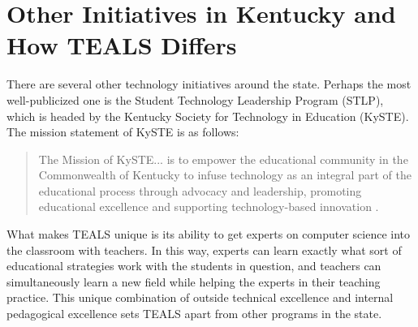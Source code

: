 \section{Other Initiatives in Kentucky and How TEALS Differs}\label{sec:diffs}

There are several other technology initiatives around the state. Perhaps the
most well-publicized one is the Student Technology Leadership Program (STLP),
which is headed by the Kentucky Society for Technology in Education (KySTE).
The mission statement of KySTE is as follows:

\begin{quote}
The Mission of KySTE... is to empower the educational community in the
Commonwealth of Kentucky to infuse technology as an integral part of the
educational process through advocacy and leadership, promoting educational
excellence and supporting technology-based innovation \autocite{KySTEAboutUs}.
\end{quote}

What makes TEALS unique is its ability to get experts on computer science into
the classroom with teachers. In this way, experts can learn exactly what sort
of educational strategies work with the students in question, and teachers
can simultaneously learn a new field while helping the experts in their
teaching practice. This unique combination of outside technical excellence
and internal pedagogical excellence sets TEALS apart from other programs
in the state.

